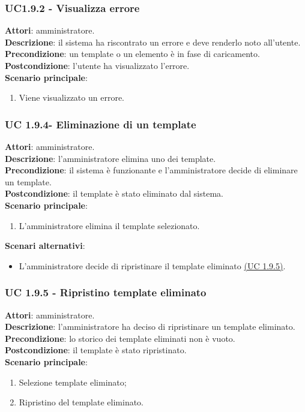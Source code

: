 \subsubsection{UC1.9.2 - Visualizza errore}{
	\label{uc1.9.2}
	\textbf{Attori}: amministratore. \\
	\textbf{Descrizione}: il sistema ha riscontrato un errore e deve renderlo noto all'utente. \\
	\textbf{Precondizione}: un template o un elemento è in fase di caricamento.	\\
	\textbf{Postcondizione}: l'utente ha visualizzato l'errore.	\\
	\textbf{Scenario principale}:
	\begin{enumerate}
		\item Viene visualizzato un errore.
	\end{enumerate}
	}
\subsubsection{UC 1.9.4- Eliminazione di un template}{
	\label{uc1.9.4}
	\textbf{Attori}: amministratore. \\
	\textbf{Descrizione}: l'amministratore elimina uno dei template. \\
	\textbf{Precondizione}: il sistema è funzionante e l'amministratore decide di eliminare un template.	\\
	\textbf{Postcondizione}: il template è stato eliminato dal sistema.	\\
	\textbf{Scenario principale}:
	\begin{enumerate}
		\item L’amministratore elimina il template selezionato.
	\end{enumerate}
	\textbf{Scenari alternativi}:
	\begin{itemize}
		\item L'amministratore decide di ripristinare il template eliminato \hyperref[uc1.9.5]{(UC 1.9.5)}.
	\end{itemize}
	}
\subsubsection{UC 1.9.5 - Ripristino template eliminato}{
	\label{uc1.9.5}
	\textbf{Attori}: amministratore. \\
	\textbf{Descrizione}: l'amministratore ha deciso di ripristinare un template eliminato. \\
	\textbf{Precondizione}: lo storico dei template eliminati non è vuoto.	\\
	\textbf{Postcondizione}: il template è stato ripristinato.	\\
	\textbf{Scenario principale}:
	\begin{enumerate}
		\item Selezione template eliminato; 
		\item Ripristino del template eliminato.
	\end{enumerate}
	}

